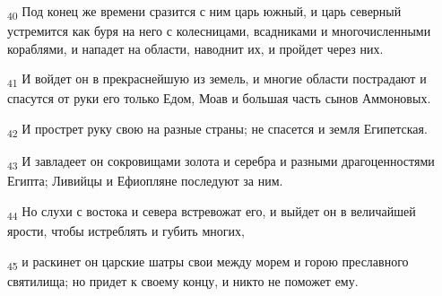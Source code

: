 \begin{tcolorbox}
\textsubscript{40} Под конец же времени сразится с ним царь южный, и царь северный устремится как буря на него с колесницами, всадниками и многочисленными кораблями, и нападет на области, наводнит их, и пройдет через них.
\end{tcolorbox}
\begin{tcolorbox}
\textsubscript{41} И войдет он в прекраснейшую из земель, и многие области пострадают и спасутся от руки его только Едом, Моав и большая часть сынов Аммоновых.
\end{tcolorbox}
\begin{tcolorbox}
\textsubscript{42} И прострет руку свою на разные страны; не спасется и земля Египетская.
\end{tcolorbox}
\begin{tcolorbox}
\textsubscript{43} И завладеет он сокровищами золота и серебра и разными драгоценностями Египта; Ливийцы и Ефиопляне последуют за ним.
\end{tcolorbox}
\begin{tcolorbox}
\textsubscript{44} Но слухи с востока и севера встревожат его, и выйдет он в величайшей ярости, чтобы истреблять и губить многих,
\end{tcolorbox}
\begin{tcolorbox}
\textsubscript{45} и раскинет он царские шатры свои между морем и горою преславного святилища; но придет к своему концу, и никто не поможет ему.
\end{tcolorbox}
